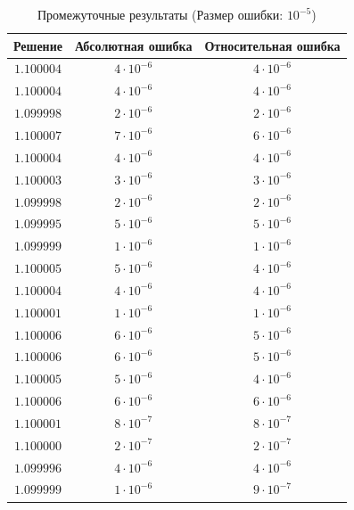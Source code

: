 \begin{table}[h]
   \centering
   \caption{Промежуточные результаты (Размер ошибки: $10^{-5}$)}
   \begin{tabular}{|c|c|c|}
       \hline
       Решение & Абсолютная ошибка & Относительная ошибка \\
       \hline
       $1.100004$ & $4 \cdot 10^{-6}$ & $4 \cdot 10^{-6}$ \\
       \hline
       $1.100004$ & $4 \cdot 10^{-6}$ & $4 \cdot 10^{-6}$ \\
       \hline
       $1.099998$ & $2 \cdot 10^{-6}$ & $2 \cdot 10^{-6}$ \\
       \hline
       $1.100007$ & $7 \cdot 10^{-6}$ & $6 \cdot 10^{-6}$ \\
       \hline
       $1.100004$ & $4 \cdot 10^{-6}$ & $4 \cdot 10^{-6}$ \\
       \hline
       $1.100003$ & $3 \cdot 10^{-6}$ & $3 \cdot 10^{-6}$ \\
       \hline
       $1.099998$ & $2 \cdot 10^{-6}$ & $2 \cdot 10^{-6}$ \\
       \hline
       $1.099995$ & $5 \cdot 10^{-6}$ & $5 \cdot 10^{-6}$ \\
       \hline
       $1.099999$ & $1 \cdot 10^{-6}$ & $1 \cdot 10^{-6}$ \\
       \hline
       $1.100005$ & $5 \cdot 10^{-6}$ & $4 \cdot 10^{-6}$ \\
       \hline
       $1.100004$ & $4 \cdot 10^{-6}$ & $4 \cdot 10^{-6}$ \\
       \hline
       $1.100001$ & $1 \cdot 10^{-6}$ & $1 \cdot 10^{-6}$ \\
       \hline
       $1.100006$ & $6 \cdot 10^{-6}$ & $5 \cdot 10^{-6}$ \\
       \hline
       $1.100006$ & $6 \cdot 10^{-6}$ & $5 \cdot 10^{-6}$ \\
       \hline
       $1.100005$ & $5 \cdot 10^{-6}$ & $4 \cdot 10^{-6}$ \\
       \hline
       $1.100006$ & $6 \cdot 10^{-6}$ & $6 \cdot 10^{-6}$ \\
       \hline
       $1.100001$ & $8 \cdot 10^{-7}$ & $8 \cdot 10^{-7}$ \\
       \hline
       $1.100000$ & $2 \cdot 10^{-7}$ & $2 \cdot 10^{-7}$ \\
       \hline
       $1.099996$ & $4 \cdot 10^{-6}$ & $4 \cdot 10^{-6}$ \\
       \hline
       $1.099999$ & $1 \cdot 10^{-6}$ & $9 \cdot 10^{-7}$ \\

\end{tabular}
\end{table}

